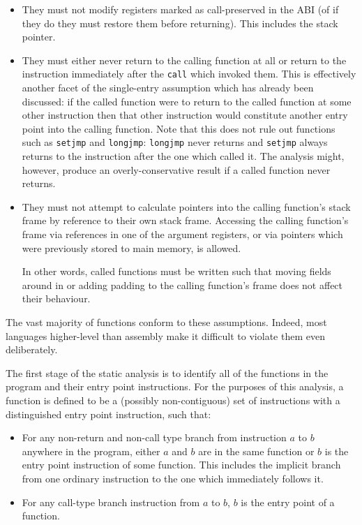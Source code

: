 \begin{itemize}
  \begin{itemize}
  \item They must not modify registers marked as call-preserved in the
    ABI (of if they do they must restore them before returning).  This
    includes the stack pointer.
  \item They must either never return to the calling function at all
    or return to the instruction immediately after the \verb|call|
    which invoked them.  This is effectively another facet of the
    single-entry assumption which has already been discussed: if the
    called function were to return to the called function at some
    other instruction then that other instruction would constitute
    another entry point into the calling function.  Note that this
    does not rule out functions such as \verb|setjmp| and
    \verb|longjmp|: \verb|longjmp| never returns and
    \verb|setjmp| always returns to the instruction after the one
    which called it.  The analysis might, however, produce an
    overly-conservative result if a called function never returns.
  \item They must not attempt to calculate pointers into the calling
    function's stack frame by reference to their own stack frame.
    Accessing the calling function's frame via references in one of
    the argument registers, or via pointers which were previously
    stored to main memory, is allowed.

    In other words, called functions must be written such that moving
    fields around in or adding padding to the calling function's frame
    does not affect their behaviour.
  \end{itemize}

  The vast majority of functions conform to these assumptions.
  Indeed, most languages higher-level than assembly make it difficult
  to violate them even deliberately.
\end{itemize}

The first stage of the static analysis is to identify all of the
functions in the program and their entry point instructions.  For the
purposes of this analysis, a function is defined to be a (possibly
non-contiguous) set of instructions with a distinguished entry point
instruction, such that:

\begin{itemize}
\item
  For any non-return and non-call type branch from instruction $a$ to
  $b$ anywhere in the program, either $a$ and $b$ are in the same
  function or $b$ is the entry point instruction of some function.
  This includes the implicit branch from one ordinary instruction to
  the one which immediately follows it.
\item
  For any call-type branch instruction from $a$ to $b$, $b$ is the
  entry point of a function.
\end{itemize}

